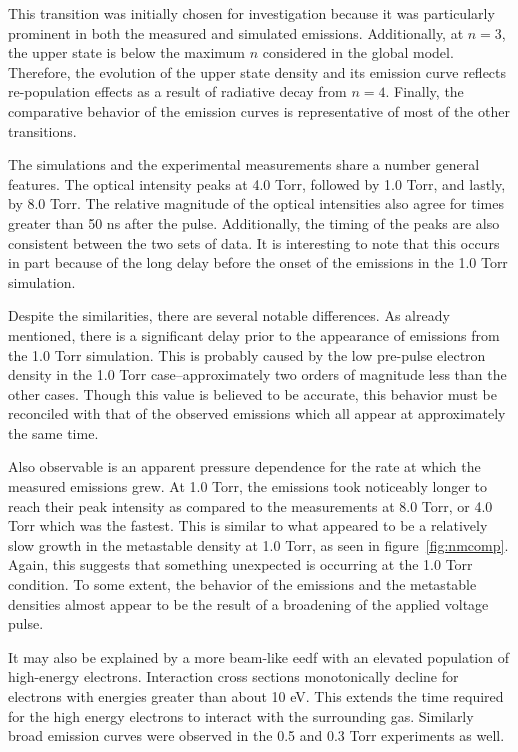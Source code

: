 This transition was initially chosen for investigation because it was
particularly prominent in both the measured and simulated emissions.
Additionally, at $n=3$, the upper state is below the maximum $n$ considered in
the global model. Therefore, the evolution of the upper state density and its
emission curve reflects re-population effects as a result of radiative decay
from $n=4$. Finally, the comparative behavior of the emission curves is
representative of most of the other transitions.

The simulations and the experimental measurements share a number general
features. The optical intensity peaks at 4.0 Torr, followed by 1.0 Torr, and
lastly, by 8.0 Torr. The relative magnitude of the optical intensities also
agree for times greater than 50 ns after the pulse. Additionally, the timing of
the peaks are also consistent between the two sets of data. It is interesting to
note that this occurs in part because of the long delay before the onset of the
emissions in the 1.0 Torr simulation.

Despite the similarities, there are several notable differences. As already
mentioned, there is a significant delay prior to the appearance of emissions
from the 1.0 Torr simulation. This is probably caused by the low pre-pulse
electron density in the 1.0 Torr case--approximately two orders of magnitude
less than the other cases. Though this value is believed to be accurate, this
behavior must be reconciled with that of the observed emissions which all appear
at approximately the same time.

Also observable is an apparent pressure dependence for the rate at which the
measured emissions grew. At 1.0 Torr, the emissions took noticeably longer to
reach their peak intensity as compared to the measurements at 8.0 Torr, or 4.0
Torr which was the fastest. This is similar to what appeared to be a relatively
slow growth in the metastable density at 1.0 Torr, as seen in
figure~\ref{fig:nmcomp}. Again, this suggests that something unexpected is
occurring at the 1.0 Torr condition. To some extent, the behavior of the
emissions and the metastable densities almost appear to be the result of a
broadening of the applied voltage pulse.

It may also be explained by a more beam-like \acs{eedf} with an elevated
population of high-energy electrons. Interaction cross sections monotonically
decline for electrons with energies greater than about 10 eV. This extends the
time required for the high energy electrons to interact with the surrounding
gas. Similarly broad emission curves were observed in the 0.5 and 0.3 Torr
experiments as well.

